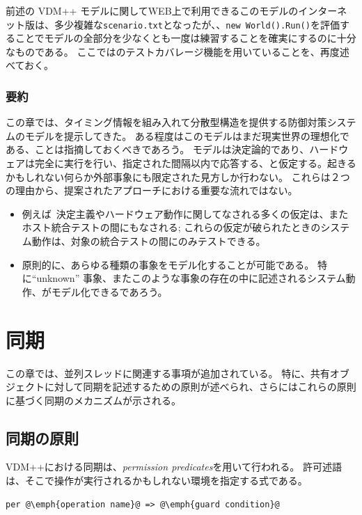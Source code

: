 \documentclass[\pformat,12pt]{jreport}
\begin{document}
前述の VDM++ モデルに関してWEB上で利用できるこのモデルのインターネット版は、多少複雑な\texttt{scenario.txt}となったが、、\texttt{new World().Run()}を評価することでモデルの全部分を少なくとも一度は練習することを確実にするのに十分なものである。
ここでは\VDMTools のテストカバレージ機能を用いていることを、再度述べておく。

\subsection{要約}

この章では、タイミング情報を組み入れて分散型構造を提供する防御対策システムのモデルを提示してきた。
ある程度はこのモデルはまだ現実世界の理想化である、ことは指摘しておくべきであろう。
モデルは決定論的であり、ハードウェアは完全に実行を行い、指定された間隔以内で応答する、と仮定する。起きるかもしれない何らか外部事象にも限定された見方しか行わない。 
これらは２つの理由から、提案されたアプローチにおける重要な流れではない。

\begin{itemize}
\item 例えば\ 決定主義やハードウェア動作に関してなされる多くの仮定は、またホスト統合テストの間にもなされる;
これらの仮定が破られたときのシステム動作は、対象の統合テストの間にのみテストできる。
\item 
原則的に、あらゆる種類の事象をモデル化することが可能である。
特に``unknown'' 事象、またこのような事象の存在の中に記述されるシステム動作、がモデル化できるであろう。
\end{itemize}

\chapter{同期}\label{chap:sync}

この章では、並列スレッドに関連する事項が追加されている。
特に、共有オブジェクトに対して同期を記述するための原則が述べられ、さらにはこれらの原則に基づく同期のメカニズムが示される。

\section{同期の原則}

VDM++における同期は、\emph{permission predicates}を用いて行われる。
許可述語は、そこで操作が実行されるかもしれない環境を指定する式である。

\begin{lstlisting}
per @\emph{operation name}@ => @\emph{guard condition}@
\end{lstlisting}
\end{document}
